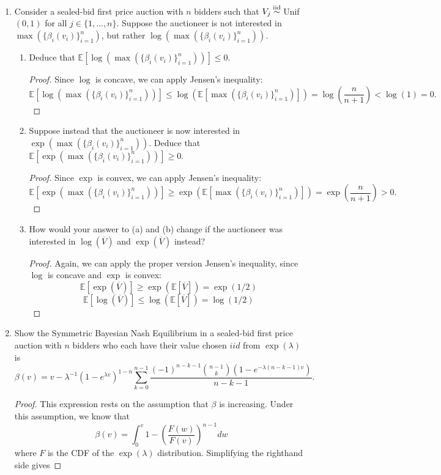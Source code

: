 \documentclass[10pt]{article}
\newcommand{\E}{\mathbb{E}}
\newcommand\simiid{\stackrel{\mathclap{\normalfont\mbox{{\scriptsize iid}}}}{\sim}}
\renewcommand{\bar}{\overline}
\begin{document}
\begin{enumerate}
\begin{enumerate}
\end{enumerate}

\item Consider a sealed-bid first price auction with $n$ bidders such that $V_j \simiid$ Unif$(0,1)$ for all $j \in \{1,\dots , n\}$.  Suppose the auctioneer is not interested in $\max (\{\beta_i (v_i)\}_{i=1}^n)$, but rather $\log(\max (\{\beta_i (v_i)\}_{i=1}^n))$.
\begin{enumerate}
\item Deduce that $\E[\log(\max (\{\beta_i (v_i)\}_{i=1}^n))] \leq 0$.

\begin{proof}
Since $\log$ is concave, we can apply Jensen's inequality:
$$
\E[\log(\max (\{\beta_i (v_i)\}_{i=1}^n))] \leq \log(\E[\max (\{\beta_i (v_i)\}_{i=1}^n)]) = \log(\frac{n}{n+1}) < \log(1) = 0.
$$
\end{proof}

\item Suppose instead that the auctioneer is now interested in $\exp(\max (\{\beta_i (v_i)\}_{i=1}^n))$.  Deduce that $\E[ \exp(\max (\{\beta_i (v_i)\}_{i=1}^n))] \geq 0.$

\begin{proof}
Since $\exp$ is convex, we can apply Jensen's inequality:
$$
\E[ \exp(\max (\{\beta_i (v_i)\}_{i=1}^n))] \geq \exp(\E[\max (\{\beta_i (v_i)\}_{i=1}^n)]) = \exp(\frac{n}{n+1}) > 0.
$$
\end{proof}

\item How would your answer to (a) and (b) change if the auctioneer was interested in $\log(\bar{V})$ and $\exp(\bar{V})$ instead?

\begin{proof}
Again, we can apply the proper version Jensen's inequality, since $\log$ is concave and $\exp$ is convex:
$$
\E[\exp(\bar{V})] \geq \exp(\E[\bar{V}]) = \exp(1/2)
$$
$$
\E[\log(\bar{V})] \leq \log(\E[\bar{V}]) = \log(1/2)
$$
\end{proof}
\end{enumerate}

\item Show the Symmetric Bayesian Nash Equilibrium in a sealed-bid first price auction with $n$ bidders who each have their value chosen $iid$ from $\exp(\lambda)$ is
$$
\beta(v) = v - \lambda^{-1}(1-e^{\lambda v})^{1-n}
\sum_{k=0}^{n-1} \frac{(-1)^{n-k-1} \binom{n-1}{k} (1 - e^{-\lambda(n-k-1)v})}{n-k-1}.
$$

\begin{proof}
This expression rests on the assumption that $\beta$ is increasing.  Under this assumption, we know that
$$
\beta(v) = \int_{0}^v 1 - \left(\frac{F(w)}{F(v)} \right)^{n-1} dw
$$
where $F$ is the CDF of the $\exp(\lambda)$ distribution.  Simplifying the righthand side gives


\end{proof}
\end{enumerate}
\end{document}
